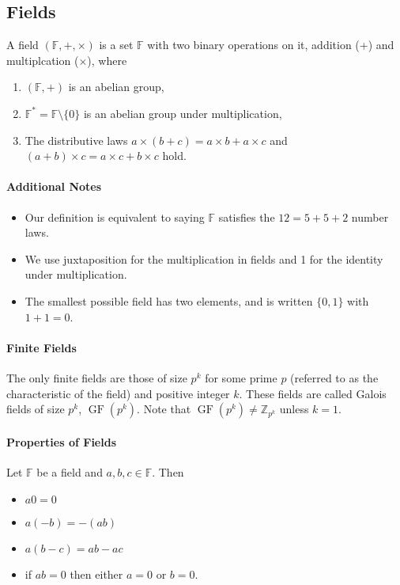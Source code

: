 \subsection{Fields}
A field \((\mathbb{F}, +, \times)\) is a set \(\mathbb{F}\) with two binary operations on it, addition (+) and multiplcation (\(\times\)), where 
\begin{enumerate}
    \item \((\mathbb{F}, +)\) is an abelian group,
    \item \(\mathbb{F}^* = \mathbb{F}\setminus\{0\}\) is an abelian group under multiplication,
    \item The distributive laws \(a \times (b + c) = a \times b + a \times c\) and \((a+b) \times c = a \times c + b \times c\) hold.
\end{enumerate}

\paragraph{Additional Notes}
\begin{itemize}
    \item Our definition is equivalent to saying \(\mathbb{F}\) satisfies the \(12 = 5 + 5 + 2\) number laws.
    \item We use juxtaposition for the multiplication in fields and 1 for the identity under multiplication.
    \item The smallest possible field has two elements, and is written \(\{0,1\}\) with \(1 + 1 = 0\).
\end{itemize}

\paragraph{Finite Fields}
The only finite fields are those of size \(p^k\) for some prime \(p\) (referred to as the characteristic of the field) and positive integer \(k\). These fields are called Galois fields of size \(p^k\), \(\operatorname{GF}(p^k)\). Note that \(\operatorname{GF}(p^k) \neq \mathbb{Z}_{p^k}\) unless \(k=1\).

\paragraph{Properties of Fields}
Let \(\mathbb{F}\) be a field and \(a,b,c \in \mathbb{F}\). Then
\begin{itemize}
    \item \(a0=0\)
    \item \(a(-b) = -(ab)\)
    \item \(a(b - c) = ab - ac\)
    \item if \(ab = 0\) then either \(a = 0\) or \(b = 0\).
\end{itemize}
